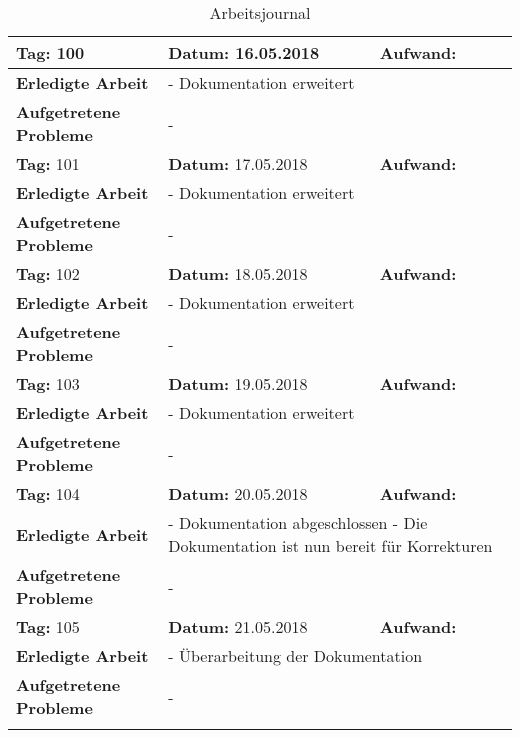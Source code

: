 \begin{longtable}{|p{5cm}|p{5cm}|p{6cm}|}
\rowcolor{heading}\textbf{Tag:} 100 & \textbf{Datum:} 16.05.2018 & \textbf{Aufwand:} \\ \hline
\textbf{Erledigte Arbeit} & \multicolumn{2}{p{11cm}|}{- Dokumentation erweitert} \\ \hline
\textbf{Aufgetretene Probleme} & \multicolumn{2}{p{11cm}|}{-} \\ \hline
\rowcolor{heading}\textbf{Tag:} 101 & \textbf{Datum:} 17.05.2018 & \textbf{Aufwand:} \\ \hline
\textbf{Erledigte Arbeit} & \multicolumn{2}{p{11cm}|}{- Dokumentation erweitert} \\ \hline
\textbf{Aufgetretene Probleme} & \multicolumn{2}{p{11cm}|}{-} \\ \hline
\rowcolor{heading}\textbf{Tag:} 102 & \textbf{Datum:} 18.05.2018 & \textbf{Aufwand:} \\ \hline
\textbf{Erledigte Arbeit} & \multicolumn{2}{p{11cm}|}{- Dokumentation erweitert} \\ \hline
\textbf{Aufgetretene Probleme} & \multicolumn{2}{p{11cm}|}{-} \\ \hline
\rowcolor{heading}\textbf{Tag:} 103 & \textbf{Datum:} 19.05.2018 & \textbf{Aufwand:} \\ \hline
\textbf{Erledigte Arbeit} & \multicolumn{2}{p{11cm}|}{- Dokumentation erweitert} \\ \hline
\textbf{Aufgetretene Probleme} & \multicolumn{2}{p{11cm}|}{-} \\ \hline
\rowcolor{heading}\textbf{Tag:} 104 & \textbf{Datum:} 20.05.2018 & \textbf{Aufwand:} \\ \hline
\textbf{Erledigte Arbeit} & \multicolumn{2}{p{11cm}|}{- Dokumentation abgeschlossen \newline
- Die Dokumentation ist nun bereit für Korrekturen} \\ \hline
\textbf{Aufgetretene Probleme} & \multicolumn{2}{p{11cm}|}{-} \\ \hline
\rowcolor{heading}\textbf{Tag:} 105 & \textbf{Datum:} 21.05.2018 & \textbf{Aufwand:} \\ \hline
\textbf{Erledigte Arbeit} & \multicolumn{2}{p{11cm}|}{- Überarbeitung der Dokumentation} \\ \hline
\textbf{Aufgetretene Probleme} & \multicolumn{2}{p{11cm}|}{-} \\ \hline
\caption{Arbeitsjournal}\\
\end{longtable}


